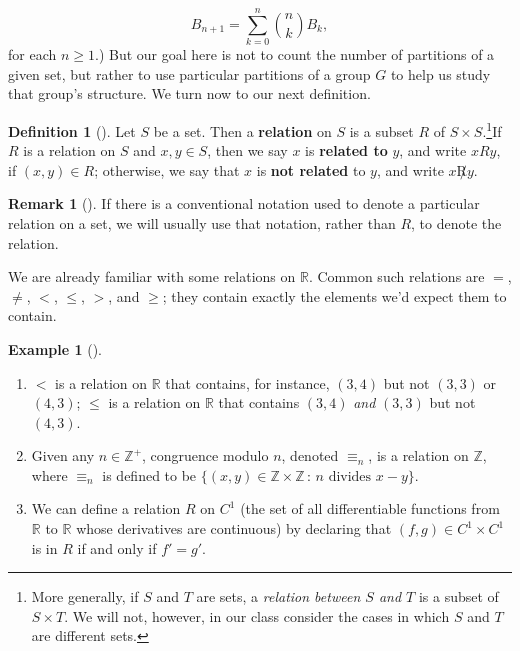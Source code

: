 \documentclass[10pt,openany,oneside]{book}
\newcommand{\terminology}[1]{\textbf{#1}}
\theoremstyle{plain}
\theoremstyle{definition}
\newtheorem{definition}[theorem]{Definition}
\theoremstyle{definition}
\newtheorem{remark}[theorem]{Remark}
\theoremstyle{definition}
\newtheorem{example}[theorem]{Example}
\theoremstyle{definition}
\numberwithin{equation}{section}
\def\Z{\mathbb{Z}}
\def\R{\mathbb{R}}
\newcommand{\lt}{<}
\begin{document}
\begin{equation*}
B_{n+1}=\sum_{k=0}^n \binom{n}{k} B_k,
\end{equation*}
for each \(n\geq 1\).) But our goal here is not to count the number of partitions of a given set, but rather to use particular partitions of a group \(G\) to help us study that group's structure. We turn now to our next definition.%
\begin{definition}[{}]\label{definition-55}
\label{notation-63}
\label{notation-64}
Let \(S\) be a set. Then a \terminology{relation} on \(S\) is a subset \(R\) of \(S\times S\).\footnote{More generally, if \(S\) and \(T\) are sets, a \emph{relation between \(S\) and \(T\)} is a subset of \(S \times T\). We will not, however, in our class consider the cases in which \(S\) and \(T\) are different sets.\label{fn-2}}If \(R\) is a relation on \(S\) and \(x,y\in S\), then we say \(x\) is \terminology{related to} \(y\), and write \(x R y\), if \((x,y)\in R\); otherwise, we say that \(x\) is \terminology{not related} to \(y\), and write \(x \not R y\).%
\end{definition}
\begin{remark}[]\label{remark-34}
If there is a conventional notation used to denote a particular relation on a set, we will usually use that notation, rather than \(R\), to denote the relation.%
\end{remark}
We are already familiar with some relations on \(\R\). Common such relations are \(=\), \(\neq\), \(\lt\), \(\leq\), \(>\), and \(\geq\); they contain exactly the elements we'd expect them to contain.%
\begin{example}[]\label{example-63}
\leavevmode%
\begin{enumerate}
\item\hypertarget{li-388}{}\(\lt\) is a relation on \(\R\) that contains, for instance, \((3,4)\) but not \((3,3)\) or \((4,3)\); \(\leq\) is a relation on \(\R\) that contains \((3,4)\) \emph{and} \((3,3)\) but not \((4,3)\).%
\item\hypertarget{li-389}{}Given any \(n\in \Z^+\), congruence modulo \(n\), denoted \(\equiv_n\), is a relation on \(\Z\), where \(\equiv_n\) is defined to be \(\{(x,y) \in \Z
\times \Z \,:\, n \text{ divides } x-y\}\).%
\item\hypertarget{li-390}{}We can define a relation \(R\) on \(C^1\) (the set of all differentiable functions from \(\R\) to \(\R\) whose derivatives are continuous) by declaring that \((f,g)\in C^1 \times C^1\) is in \(R\) if and only if \(f'=g'\).%
\end{enumerate}
%
\end{example}
\end{document}
